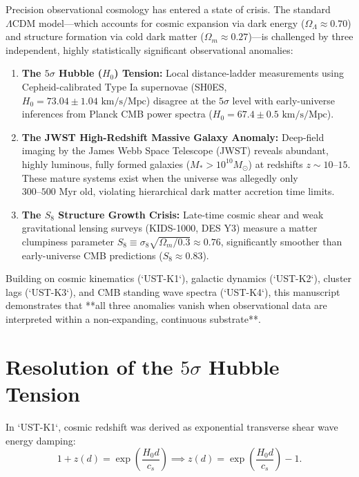 \documentclass[11pt,a4paper]{article}
\begin{document}
	Precision observational cosmology has entered a state of crisis. The standard $\Lambda\text{CDM}$ model—which accounts for cosmic expansion via dark energy ($\Omega_\Lambda \approx 0.70$) and structure formation via cold dark matter ($\Omega_m \approx 0.27$)—is challenged by three independent, highly statistically significant observational anomalies:
	\begin{enumerate}
		\item \textbf{The $5\sigma$ Hubble ($H_0$) Tension:} Local distance-ladder measurements using Cepheid-calibrated Type Ia supernovae (SH0ES, $H_0 = 73.04 \pm 1.04 \text{ km/s/Mpc}$) disagree at the $5\sigma$ level with early-universe inferences from Planck CMB power spectra ($H_0 = 67.4 \pm 0.5 \text{ km/s/Mpc}$).
		\item \textbf{The JWST High-Redshift Massive Galaxy Anomaly:} Deep-field imaging by the James Webb Space Telescope (JWST) reveals abundant, highly luminous, fully formed galaxies ($M_* > 10^{10} M_\odot$) at redshifts $z \sim 10\text{--}15$. These mature systems exist when the universe was allegedly only $300\text{--}500 \text{ Myr}$ old, violating hierarchical dark matter accretion time limits.
		\item \textbf{The $S_8$ Structure Growth Crisis:} Late-time cosmic shear and weak gravitational lensing surveys (KIDS-1000, DES Y3) measure a matter clumpiness parameter $S_8 \equiv \sigma_8 \sqrt{\Omega_m / 0.3} \approx 0.76$, significantly smoother than early-universe CMB predictions ($S_8 \approx 0.83$).
	\end{enumerate}
	
	Building on cosmic kinematics (`UST-K1`), galactic dynamics (`UST-K2`), cluster lags (`UST-K3`), and CMB standing wave spectra (`UST-K4`), this manuscript demonstrates that **all three anomalies vanish when observational data are interpreted within a non-expanding, continuous substrate**.
	
	\section{Resolution of the $5\sigma$ Hubble Tension}
	\label{sec:h0_tension}
	
	In `UST-K1`, cosmic redshift was derived as exponential transverse shear wave energy damping:
	\begin{equation}
		1 + z(d) = \exp\left( \frac{H_0 d}{c_s} \right) \implies z(d) = \exp\left( \frac{H_0 d}{c_s} \right) - 1.
		\label{eq:k1_damping_redshift_recap}
	\end{equation}
	
\end{document}
